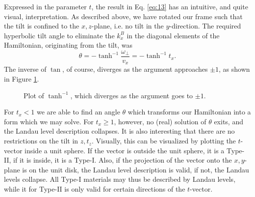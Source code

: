 Expressed in the parameter \(t\), the result in Eq. \eqref{eq:13} has an intuitive, and quite visual, interpretation.
As described above, we have rotated our frame such that the tilt is confined to the \(x,z\)-plane, i.e. no tilt in the \(y\)-direction.
The required hyperbolic tilt angle to eliminate the \(k^B_{x}\) in the diagonal elements of the Hamiltonian, originating from the tilt, was
\begin{equation}
  \label{eq:15}
  \theta = - \tanh^{-1} \frac{\omega_{\perp}}{v_{x}} = - \tanh^{-1} t_{x}.
\end{equation}
The inverse of \(\tan \), of course, diverges as the argument approaches \(\pm 1\), as shown in Figure \ref{fig:arctanh}.
\begin{figure}[ht]
  \centering
  \caption{\label{fig:arctanh} Plot of \(\tanh^{-1}\), which diverges as the argument goes to \(\pm 1\).}
\end{figure}
For \(t_{x} < 1\) we are able to find an angle \(\theta \) which transforms our Hamiltonian into a form which we may solve.
For \(t_{x} \geq 1\), however, no (real) solution of \(\theta \) exits, and the Landau level description collapses.
It is also interesting that there are no restrictions on the tilt in \(z, t_{z}\).
Visually, this can be visualized by plotting the \(t\)-vector inside a unit sphere.
If the vector is outside the unit sphere, it is a Type-II, if it is inside, it is a Type-I.
Also, if the projection of the vector onto the \(x,y\)-plane is on the unit disk, the Landau level description is valid, if not, the Landau levels collapse.
All Type-I materials may thus be described by Landau levels, while it for Type-II is only valid for certain directions of the \(t\)-vector.
